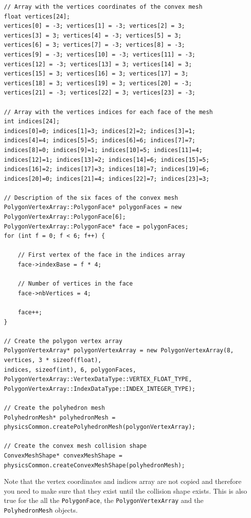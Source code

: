 \documentclass[a4paper,12pt]{article}
\begin{document}
    \begin{lstlisting}
// Array with the vertices coordinates of the convex mesh
float vertices[24];
vertices[0] = -3; vertices[1] = -3; vertices[2] = 3;
vertices[3] = 3; vertices[4] = -3; vertices[5] = 3;
vertices[6] = 3; vertices[7] = -3; vertices[8] = -3;
vertices[9] = -3; vertices[10] = -3; vertices[11] = -3;
vertices[12] = -3; vertices[13] = 3; vertices[14] = 3;
vertices[15] = 3; vertices[16] = 3; vertices[17] = 3;
vertices[18] = 3; vertices[19] = 3; vertices[20] = -3;
vertices[21] = -3; vertices[22] = 3; vertices[23] = -3;

// Array with the vertices indices for each face of the mesh
int indices[24];
indices[0]=0; indices[1]=3; indices[2]=2; indices[3]=1;
indices[4]=4; indices[5]=5; indices[6]=6; indices[7]=7;
indices[8]=0; indices[9]=1; indices[10]=5; indices[11]=4;
indices[12]=1; indices[13]=2; indices[14]=6; indices[15]=5;
indices[16]=2; indices[17]=3; indices[18]=7; indices[19]=6;
indices[20]=0; indices[21]=4; indices[22]=7; indices[23]=3;

// Description of the six faces of the convex mesh
PolygonVertexArray::PolygonFace* polygonFaces = new PolygonVertexArray::PolygonFace[6];
PolygonVertexArray::PolygonFace* face = polygonFaces;
for (int f = 0; f < 6; f++) {

    // First vertex of the face in the indices array
    face->indexBase = f * 4;   

    // Number of vertices in the face
    face->nbVertices = 4;

    face++;
}

// Create the polygon vertex array
PolygonVertexArray* polygonVertexArray = new PolygonVertexArray(8, vertices, 3 * sizeof(float),
indices, sizeof(int), 6, polygonFaces,
PolygonVertexArray::VertexDataType::VERTEX_FLOAT_TYPE,
PolygonVertexArray::IndexDataType::INDEX_INTEGER_TYPE);

// Create the polyhedron mesh
PolyhedronMesh* polyhedronMesh = physicsCommon.createPolyhedronMesh(polygonVertexArray);

// Create the convex mesh collision shape
ConvexMeshShape* convexMeshShape = physicsCommon.createConvexMeshShape(polyhedronMesh);
  \end{lstlisting}

    \vspace{0.6cm}

    Note that the vertex coordinates and indices array are not copied and therefore you need to make sure that they exist until the collision shape
    exists. This is also true for the all the \texttt{PolygonFace}, the \texttt{PolygonVertexArray} and the \texttt{PolyhedronMesh} objects. \\
\end{document}
